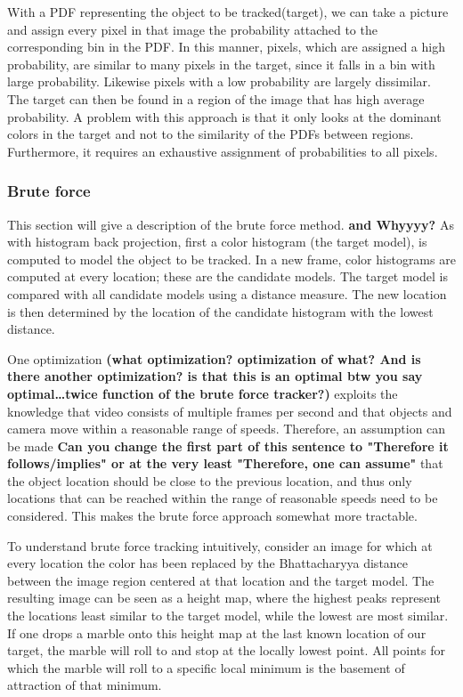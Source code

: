 \documentclass[a4paper,11pt]{article}
\begin{document}
With a PDF representing the object to be tracked(target), we can take a picture and assign every pixel in that image the probability attached to the corresponding bin in the PDF. In this manner, pixels, which are assigned a high probability, are similar to many pixels in the target, since it falls in a bin with large probability. Likewise pixels with a low probability are largely dissimilar. The target can then be found in a region of the image that has high average probability. A problem with this approach is that it only looks at the dominant colors in the target and not to the similarity of the PDFs between regions. Furthermore, it requires an exhaustive assignment of probabilities to all pixels.


\subsubsection{Brute force}
This section will give a description of the brute force method. \textbf{and Whyyyy?} As with histogram back projection, first a color histogram (the target model), is computed to model the object to be tracked. In a new frame, color histograms are computed at every location; these are the candidate models. The target model is compared with all candidate models using a distance measure. The new location is then determined by the location of the candidate histogram with the lowest distance.

One optimization \textbf{(what optimization? optimization of what? And is there another optimization? is that this is an optimal \textbf{btw you say optimal\ldots twice} function of the brute force tracker?)} exploits the knowledge that video consists of multiple frames per second and that objects and camera move within a reasonable range of speeds. Therefore, an assumption can be made \textbf{Can you change the first part of this sentence to "Therefore it follows/implies" or at the very least "Therefore, one can assume"} that the object location should be close to the previous location, and thus only locations that can be reached within the range of reasonable speeds need to be considered. This makes the brute force approach somewhat more tractable. 

To understand brute force tracking intuitively, consider an image for which at every location the color has been replaced by the Bhattacharyya distance between the image region centered at that location and the target model. The resulting image can be seen as a height map, where the highest peaks represent the locations least similar to the target model, while the lowest are most similar. If one drops a marble onto this height map at the last known location of our target, the marble will roll to and stop at the locally lowest point. All points for which the marble will roll to a specific local minimum is the basement of attraction of that minimum. 
\end{document}
